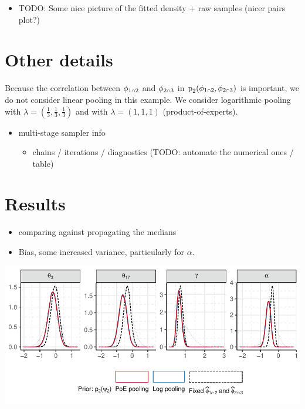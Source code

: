 \documentclass[
  10pt,
  a4paper,
]{article}
\providecommand{\tightlist}{%
  \setlength{\itemsep}{0pt}\setlength{\parskip}{0pt}}
\let\Oldcap\cap
\renewcommand{\cap}{\mathrel{\mathsmaller{\Oldcap}}}
\newcommand{\pd}{\text{p}}
\begin{document}
\begin{itemize}
\tightlist
\item
  TODO: Some nice picture of the fitted density + raw samples (nicer
  pairs plot?)
\end{itemize}

\hypertarget{other-details}{%
\section{Other details}\label{other-details}}

Because the correlation between \(\phi_{1 \cap 2}\) and
\(\phi_{2 \cap 3}\) in \(\pd_{2}(\phi_{1 \cap 2}, \phi_{2 \cap 3})\) is
important, we do not consider linear pooling in this example. We
consider logarithmic pooling with
\(\lambda = (\frac{1}{3}, \frac{1}{3}, \frac{1}{3})\) and with
\(\lambda = (1, 1, 1)\) (product-of-experts).

\begin{itemize}
\tightlist
\item
  multi-stage sampler info

  \begin{itemize}
  \tightlist
  \item
    chains / iterations / diagnostics (TODO: automate the numerical ones
    / table)
  \end{itemize}
\end{itemize}

\hypertarget{results}{%
\section{Results}\label{results}}

\begin{itemize}
\tightlist
\item
  comparing against propagating the medians
\item
  Bias, some increased variance, particularly for \(\alpha\).
\end{itemize}

\begin{center}\includegraphics{../plots/mimic-example/psi-2-method-comparison-small} \end{center}
\end{document}
